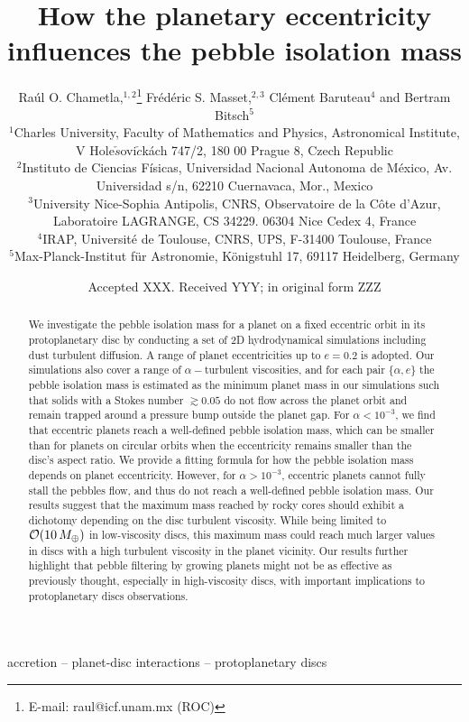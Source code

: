 \documentclass[fleqn,usenatbib]{mnras}
\title[eccentricity influences the pebble isolation mass]{How the planetary eccentricity influences the pebble isolation mass}
\author[Chametla et al.]{
Raúl O. Chametla,$^{1,2}$\thanks{E-mail: raul@icf.unam.mx (ROC)}
Frédéric S. Masset,$^{2,3}$
Clément Baruteau$^{4}$ and 
Bertram Bitsch$^{5}$
\\
$^{1}$Charles University, Faculty of Mathematics and Physics, Astronomical Institute, V Hole$\check{s}$ovi$\check{c}$k\'ach 747/2, 180 00 Prague 8, Czech Republic\\
$^{2}$Instituto de Ciencias F\'isicas, Universidad Nacional Autonoma de M\'exico, Av. Universidad s/n, 62210 Cuernavaca, Mor., Mexico\\
$^{3}$University Nice-Sophia Antipolis, CNRS, Observatoire de la C\^ote d'Azur, Laboratoire LAGRANGE, CS 34229. 06304 Nice Cedex 4, France\\
$^{4}$IRAP, Universit\'e de Toulouse, CNRS, UPS, F-31400 Toulouse, France\\
$^{5}$Max-Planck-Institut für Astronomie, Königstuhl 17, 69117 Heidelberg, Germany\\
}
\date{Accepted XXX. Received YYY; in original form ZZZ}
\begin{document}
\label{firstpage}
\pagerange{\pageref{firstpage}--\pageref{lastpage}}
\maketitle

\begin{abstract}  %
We investigate the pebble isolation mass for a planet on a fixed eccentric orbit in its protoplanetary disc by conducting a set of 2D hydrodynamical simulations including dust turbulent diffusion. A range of planet eccentricities up to $e=0.2$ is adopted. Our simulations also cover a range of $\alpha-$turbulent viscosities, and for each pair $\{\alpha,e\}$ the pebble isolation mass is estimated as the minimum planet mass in our simulations such that solids with a Stokes number $\gtrsim 0.05$ do not flow across the planet orbit and remain trapped around a pressure bump outside the planet gap. For $\alpha<10^{-3}$, we find that eccentric planets reach a well-defined pebble isolation mass, which can be smaller than for planets on circular orbits when the eccentricity remains smaller than the disc's aspect ratio. We provide a fitting formula for how the pebble isolation mass depends on planet eccentricity. However, for $\alpha > 10^{-3}$, eccentric planets cannot fully stall the pebbles flow, and thus do not reach a well-defined pebble isolation mass. Our results suggest that the maximum mass reached by rocky cores should exhibit a dichotomy depending on the disc turbulent viscosity. While being limited to ${\cal O}(10\,M_\oplus)$ in low-viscosity discs, this maximum mass could reach much larger values in discs with a high turbulent viscosity in the planet vicinity. Our results further highlight that pebble filtering by growing planets might not be as effective as previously thought, especially in high-viscosity discs, with important implications to protoplanetary discs observations.
\end{abstract}

\begin{keywords}
accretion -- planet-disc interactions -- protoplanetary discs
\end{keywords}


\end{document}
